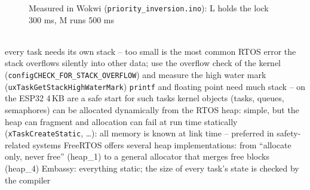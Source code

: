 \begin{description}
\begin{figure}[!hbtp]
\begin{center}
{}
\caption{Measured in Wokwi (\texttt{priority\_inversion.ino}): L holds the lock 300 ms, M runs 500 ms}
\end{center}
\end{figure}
\os{\newpage}

\item[{\rot\bf Memory in an RTOS}]~\\[-\lblskip]
\bi
	\ite every task needs its own stack -- too small is the most common RTOS error
	\bi
		\ite the stack overflows silently into other data; use the overflow check of the kernel (\texttt{configCHECK\_FOR\_STACK\_OVERFLOW}) and measure the high water mark (\texttt{uxTaskGetStackHighWaterMark})
		\ite \texttt{printf} and floating point need much stack -- on the ESP32 4\,KB are a safe start for such tasks
	\ei
	\ite kernel objects (tasks, queues, semaphores) can be allocated
	\bi
		\ite dynamically from the RTOS heap: simple, but the heap can fragment and allocation can fail at run time
		\ite statically (\texttt{xTaskCreateStatic}, \ldots): all memory is known at link time -- preferred in safety-related systems
	\ei
	\ite FreeRTOS offers several heap implementations: from ``allocate only, never free'' (heap\_1) to a general allocator that merges free blocks (heap\_4)
	\ite Embassy: everything static; the size of every task's state is checked by the compiler
\ei
\os{\newpage}
\end{description}

